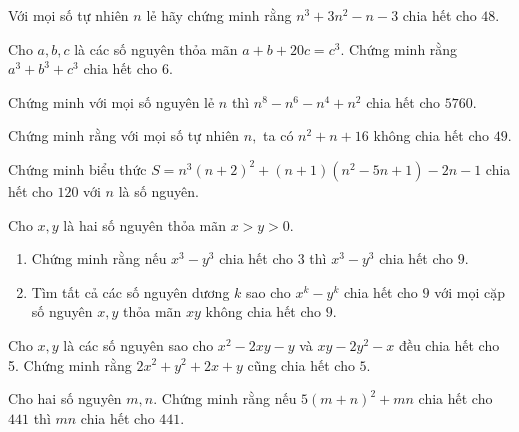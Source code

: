 \begin{btt}
Với mọi số tự nhiên $n$ lẻ hãy chứng minh rằng $n^{3}+3 n^{2}-n-3$ chia hết cho $48.$
\end{btt}

\begin{btt}
Cho $a,b,c$ là các số nguyên thỏa mãn $a+b+20c=c^3.$ Chứng minh rằng $a^3+b^3+c^3$ chia hết cho $6.$
\end{btt}


\begin{btt}
Chứng minh với mọi số nguyên lẻ $n$ thì $n^8-n^6-n^4+n^2$ chia hết cho $5760.$
\end{btt}

\begin{btt}
Chứng minh rằng với mọi số tự nhiên $n,$ ta có $n^2+n+16$ không chia hết cho $49.$
\end{btt}

\begin{btt}
Chứng minh biểu thức $S = {n^3}{\left( {n + 2} \right)^2} + \left( {n + 1} \right)\left( {{n^2} - 5n + 1} \right) - 2n - 1$ chia hết cho $120$ với $n$ là số nguyên.
\end{btt}

\begin{btt}
 Cho $x,y$ là hai số nguyên thỏa mãn $x>y>0.$
\begin{enumerate}[a,]
     \item Chứng minh rằng nếu $x^3-y^3$ chia hết cho $3$ thì $x^3-y^3$ chia hết cho $9.$
     \item Tìm tất cả các số nguyên dương $k$ sao cho $x^k-y^k$ chia hết cho $9$ với mọi cặp số nguyên $x,y$ thỏa mãn $xy$ không chia hết cho $9.$
 \end{enumerate}
\end{btt}

\begin{btt}
Cho $x, y$ là các số nguyên sao cho $x^2-2xy-y$ và $xy-2y^2-x$ đều chia hết cho 5. Chứng minh rằng $2x^2+y^2+2x+y$ cũng chia hết cho $5.$
\end{btt}

\begin{btt}
Cho hai số nguyên $m,n.$ Chứng minh rằng nếu $5(m+n)^2+mn$ chia hết cho $441$ thì $mn$ chia hết cho $441.$
\end{btt}

